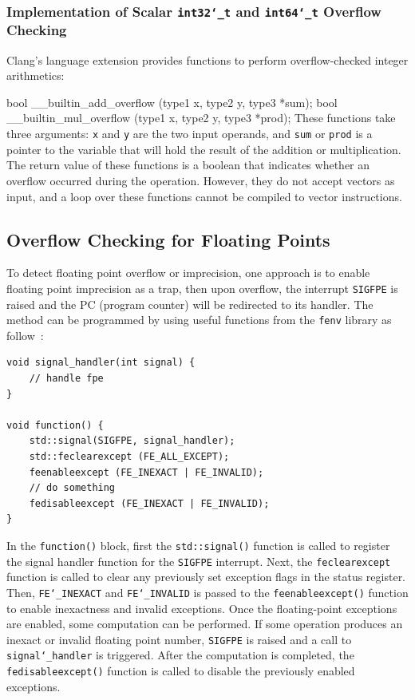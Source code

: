 \documentclass[logo,bsc,singlespacing,parskip]{infthesis}
\newcommand{\sigfpe}{\texttt{SIGFPE}}
\newcommand{\dtint}{\texttt{int32\char`_t}}
\newcommand{\dtlong}{\texttt{int64\char`_t}}
\newcommand{\feinexact}{\texttt{FE\char`_INEXACT}}
\newcommand{\feinvalid}{\texttt{FE\char`_INVALID}}
\newenvironment{VerbatimCompact}
  {\vspace*{-2.5mm}\VerbatimEnvironment
   \par\Verbatim}
  {\endVerbatim\vspace*{-2.4mm}}
\begin{document}
\subsubsection{Implementation of Scalar \dtint{} and \dtlong{}
Overflow Checking} 

Clang's language extension provides functions to perform overflow-checked
integer arithmetics: 
\begin{VerbatimCompact}
bool __builtin_add_overflow (type1 x, type2 y, type3 *sum);
bool __builtin_mul_overflow (type1 x, type2 y, type3 *prod);
\end{VerbatimCompact}
These functions take three arguments: \texttt{x} and \texttt{y} are the two
input operands, and \texttt{sum} or \texttt{prod} is a pointer to the variable
that will hold the result of the addition or multiplication. The return value of
these functions is a boolean that indicates whether an overflow occurred during
the operation. However, they do not accept vectors as input, 
and a loop over these functions cannot be compiled to vector instructions.


\subsection{Overflow Checking for Floating Points}
\label{sec:overflow-float}
To detect floating point overflow or imprecision, one approach is to enable
floating point imprecision as a trap, then upon overflow, the interrupt \sigfpe{}
is raised and the PC (program counter) will be redirected to its handler. The
method can be programmed by using useful functions from the \texttt{fenv}
library as follow~\cite{fenvlib}:
\begin{verbatim}
void signal_handler(int signal) {
    // handle fpe
}

void function() {
    std::signal(SIGFPE, signal_handler);
    std::feclearexcept (FE_ALL_EXCEPT);
    feenableexcept (FE_INEXACT | FE_INVALID);
    // do something
    fedisableexcept (FE_INEXACT | FE_INVALID);
}
\end{verbatim}

In the \texttt{function()} block, first the \texttt{std::signal()} function is
called to register the signal handler function for the \sigfpe{} interrupt. Next,
the \texttt{feclearexcept} function is called to clear any previously set
exception flags in the status register. Then, \feinexact{} and \feinvalid{} is
passed to the \texttt{feenableexcept()} function to enable inexactness and
invalid exceptions. Once the floating-point exceptions are enabled, some
computation can be performed. If some operation produces an inexact or invalid
floating point number, \sigfpe{} is raised and a call to
\texttt{signal\char`_handler} is triggered. After the computation is completed,
the \texttt{fedisableexcept()} function is called to disable the previously
enabled exceptions. 
\end{document}
